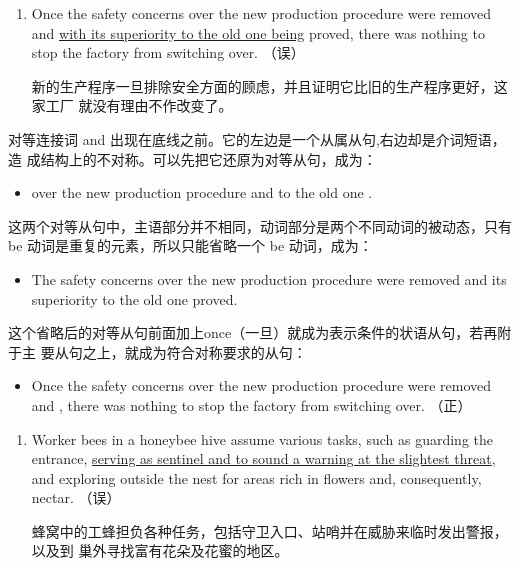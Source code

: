 \begin{enumerate}[resume]
\item Once the safety concerns over the new production procedure were removed
  and \ul{with its superiority to the old one being} proved, there was nothing to
  stop the factory from switching over. （误）

  新的生产程序一旦排除安全方面的顾虑，并且证明它比旧的生产程序更好，这家工厂
  就没有理由不作改变了。
\end{enumerate}

对等连接词 and 出现在底线之前。它的左边是一个从属从句,右边却是介词短语，造
成结构上的不对称。可以先把它还原为对等从句，成为：
\begin{itemize}
\item {} over the new production procedure
   and  to the old one
  .
\end{itemize}

这两个对等从句中，主语部分并不相同，动词部分是两个不同动词的被动态，只有
be 动词是重复的元素，所以只能省略一个 be 动词，成为：
\begin{itemize}
\item The safety concerns over the new production procedure were removed and
  its superiority to the old one proved.
\end{itemize}

这个省略后的对等从句前面加上once（一旦）就成为表示条件的状语从句，若再附于主
要从句之上，就成为符合对称要求的从句：
\begin{mybox}
\begin{itemize}
\item Once the safety concerns over the new production procedure were removed
  and , there was nothing to stop the
  factory from switching over. （正）
\end{itemize}
\end{mybox}

\begin{enumerate}[resume]
\item Worker bees in a honeybee hive assume various tasks, such as guarding the
  entrance, \ul{serving as sentinel and to sound a warning at the slightest
  threat}, and exploring outside the nest for areas rich in flowers and,
  consequently, nectar. （误）

  蜂窝中的工蜂担负各种任务，包括守卫入口、站哨并在威胁来临时发出警报，以及到
  巢外寻找富有花朵及花蜜的地区。
\end{enumerate}

